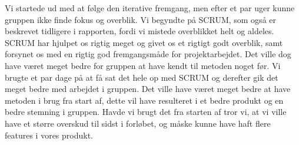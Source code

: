 Vi startede ud med at følge den iterative fremgang, men efter et par uger kunne gruppen ikke finde fokus og overblik.
Vi begyndte på SCRUM, som også er beskrevet tidligere i rapporten, fordi vi mistede overblikket helt og aldeles.
SCRUM har hjulpet os rigtig meget og givet os et rigtigt godt overblik, samt forsynet os med en rigtig god fremgangsmåde for projektarbejdet.
Det ville dog have været meget bedre for gruppen at have kendt til metoden noget før.
Vi brugte et par dage på at få sat det hele op med SCRUM og derefter gik det meget bedre med arbejdet i gruppen.
Det ville have været meget bedre at have metoden i brug fra start af, dette vil have resulteret i et bedre produkt og en bedre stemning i gruppen.
Havde vi brugt det fra starten af tror vi, at vi ville have et større overskud til sidst i forløbet, og måske kunne have haft flere features i vores produkt.
